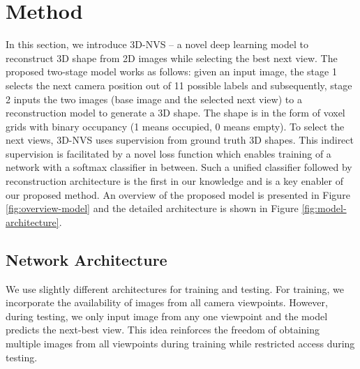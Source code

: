 \section{Method}
\label{sec:method}
In this section, we introduce 3D-NVS -- a novel deep learning model to reconstruct 3D shape from 2D images while selecting the best next view. The proposed two-stage model works as follows: given an input image, the stage 1 selects the next camera position out of 11 possible labels and subsequently, stage 2 inputs the two images (base image and the selected next view) to a reconstruction model to generate a 3D shape. The shape is in the form of voxel grids with binary occupancy (1 means occupied, 0 means empty). To select the next views, 3D-NVS uses supervision from ground truth 3D shapes. This indirect supervision is facilitated by a novel loss function which enables training of a network with a softmax classifier in between. Such a unified classifier followed by reconstruction architecture is the first in our knowledge and is a key enabler of our proposed method. An overview of the proposed model is presented in Figure \ref{fig:overview-model} and the detailed architecture is shown in Figure \ref{fig:model-architecture}.
\subsection{Network Architecture}
We use slightly different architectures for training and testing. For training, we incorporate the availability of images from all camera viewpoints. However, during testing, we only input image from any one viewpoint and the model predicts the next-best view. This idea reinforces the freedom of obtaining multiple images from all viewpoints during training while restricted access during testing. %

